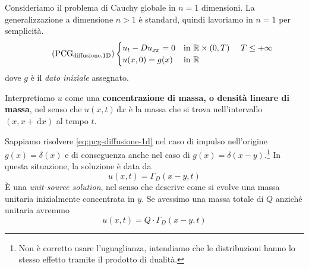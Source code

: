 \documentclass[10pt,a4paper,twoside,openright]{book}
\newcommand{\de}{\,\mathrm d}
\newcommand{\dx}{\de x}
\begin{document}
Consideriamo il problema di Cauchy globale in $n=1$ dimensioni. La generalizzazione a dimensione $n >1$ è standard, quindi lavoriamo in $n=1$ per semplicità.
\begin{equation*}
	\tag{PCG$_{\text{diffusione,1D}}$}
	\begin{cases}
		u_{t} -Du_{xx} =0 & \text{in} \ \mathbb{R} \times (0,T) \ \ \ \ T\leqslant +\infty \\
		u(x,0) =g(x) & \text{in} \ \mathbb{R}
	\end{cases}
	\label{eq:pcg-diffusione-1d}
\end{equation*}
dove $g$ è il \textit{dato iniziale} assegnato.

Interpretiamo $u$ come una \textbf{concentrazione di massa, o densità lineare di massa}, nel senso che $u(x,t) \dx$ è la massa che si trova nell'intervallo $(x,x+\dx)$ al tempo $t$.

Sappiamo risolvere \eqref{eq:pcg-diffusione-1d} nel caso di impulso nell'origine $g(x) =\delta (x)$ e di conseguenza anche nel caso di $g(x) =\delta (x-y)$.\footnote{Non è corretto usare l'uguaglianza, intendiamo che le distribuzioni hanno lo stesso effetto tramite il prodotto di dualità.} In questa situazione, la soluzione è data da
\begin{equation*}
u(x,t) =\Gamma _{D}(x-y,t)
\end{equation*}
È una \textit{unit-source solution}, nel senso che descrive come si evolve una massa unitaria inizialmente concentrata in $y$. Se avessimo una massa totale di $Q$ anziché unitaria avremmo
\begin{equation*}
u(x,t) =Q\cdotp \Gamma _{D}(x-y,t)
\end{equation*}
\end{document}
